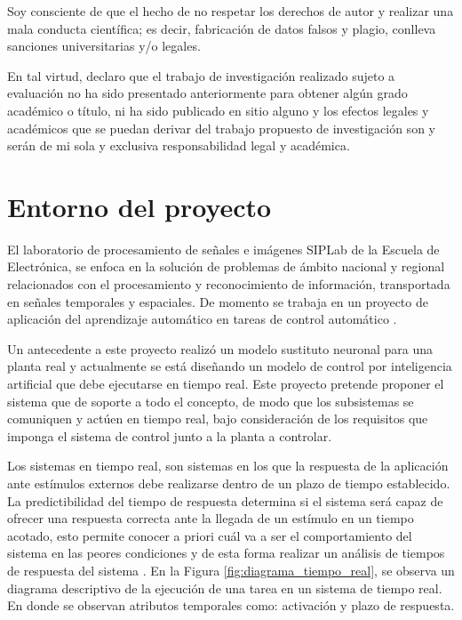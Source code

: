 \documentclass[12pt]{article}
\begin{document}
Soy consciente de que el hecho de no respetar los derechos de autor y realizar una mala conducta científica; es decir, fabricación de datos falsos y plagio, conlleva
sanciones universitarias y/o legales.

En tal virtud, declaro que el trabajo de investigación realizado sujeto a evaluación no ha sido presentado anteriormente para obtener algún grado académico o título, ni ha sido publicado en sitio alguno y los efectos legales y académicos que se puedan derivar del trabajo propuesto de investigación son y serán de mi sola y exclusiva responsabilidad legal y académica.

\newpage
\tableofcontents

\newpage

\section{Entorno del proyecto}

El laboratorio de procesamiento de señales e imágenes SIPLab de la Escuela de Electrónica, se enfoca en la solución de problemas de ámbito nacional y regional relacionados con el procesamiento y reconocimiento de información, transportada en señales temporales y espaciales. De momento se trabaja en un proyecto de aplicación del aprendizaje automático en tareas de control automático  \cite{SIPLab} \cite{13_se}.

Un antecedente a este proyecto realizó un modelo sustituto neuronal para una planta real y actualmente se está diseñando un modelo de control por inteligencia artificial que debe ejecutarse en tiempo real. Este proyecto pretende proponer el sistema que de soporte a todo el concepto, de modo que los subsistemas se comuniquen y actúen en tiempo real, bajo consideración de los requisitos que imponga el sistema de control junto a la planta a controlar. 

Los sistemas en tiempo real, son sistemas en los que la respuesta de la aplicación ante estímulos externos debe realizarse dentro de un plazo de tiempo establecido. La predictibilidad del tiempo de respuesta determina si el sistema será capaz de ofrecer una respuesta correcta ante la llegada de un estímulo en un tiempo acotado, esto permite conocer a priori cuál va a ser el comportamiento del sistema en las peores condiciones y de esta forma realizar un análisis de tiempos de respuesta del sistema \cite{alonso2010panoramica}. En la Figura \ref{fig:diagrama_tiempo_real}, se observa un diagrama descriptivo de la ejecución de una tarea en un sistema de tiempo real. En donde se observan atributos temporales como: activación y plazo de respuesta\cite{de2000introduccion}.
\end{document}
